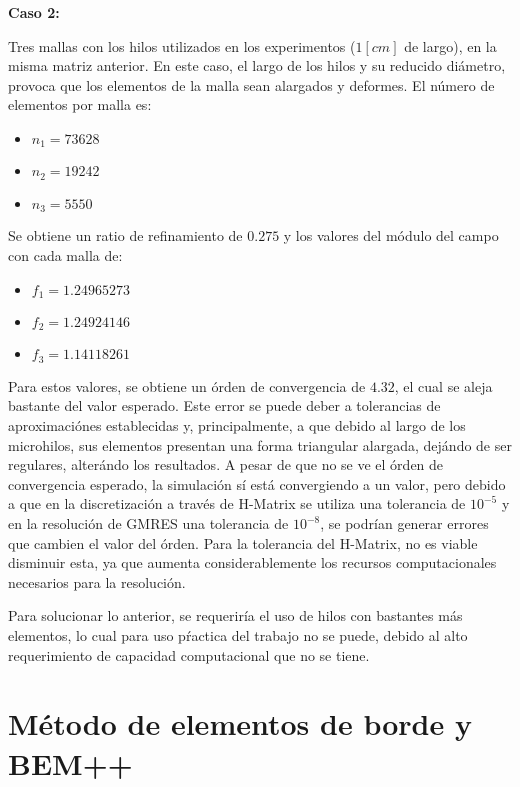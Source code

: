 \documentclass[12pt,letterpaper]{report}
\numberwithin{equation}{section}
\begin{document}
\vspace{4mm}
\textbf{Caso 2:}
\vspace{3mm}

Tres mallas con los hilos utilizados en los experimentos ($1 [cm]$ de largo), en la misma matriz anterior. En este caso, el largo de los hilos y su reducido diámetro, provoca que los elementos de la malla sean alargados y deformes. El número de elementos por malla es:

\begin{itemize}
	\item $n_1 = 73628$
	\item $n_2 = 19242$
	\item $n_3 = 5550$
\end{itemize}

Se obtiene un ratio de refinamiento de $0.275$ y los valores del módulo del campo con cada malla de:

\begin{itemize}
	\item $f_1 = 1.24965273$
	\item $f_2 = 1.24924146$
	\item $f_3 = 1.14118261$
\end{itemize}

Para estos valores, se obtiene un órden de convergencia de $4.32$, el cual se aleja bastante del valor esperado. Este error se puede deber a tolerancias de aproximaciónes establecidas y, principalmente, a que debido al largo de los microhilos, sus elementos presentan una forma triangular alargada, dejándo de ser regulares, alterándo los resultados. A pesar de que no se ve el órden de convergencia esperado, la simulación sí está convergiendo a un valor, pero debido a que en la discretización a través de H-Matrix se utiliza una tolerancia de $10^{-5}$ y en la resolución de GMRES una tolerancia de $10^{-8}$, se podrían generar errores que cambien el valor del órden. Para la tolerancia del H-Matrix, no es viable disminuir esta, ya que aumenta considerablemente los recursos computacionales necesarios para la resolución. 

Para solucionar lo anterior, se requeriría el uso de hilos con bastantes más elementos, lo cual para uso pŕactica del trabajo no se puede, debido al alto requerimiento de capacidad computacional que no se tiene.

\chapter{Método de elementos de borde y BEM++}
\end{document}
